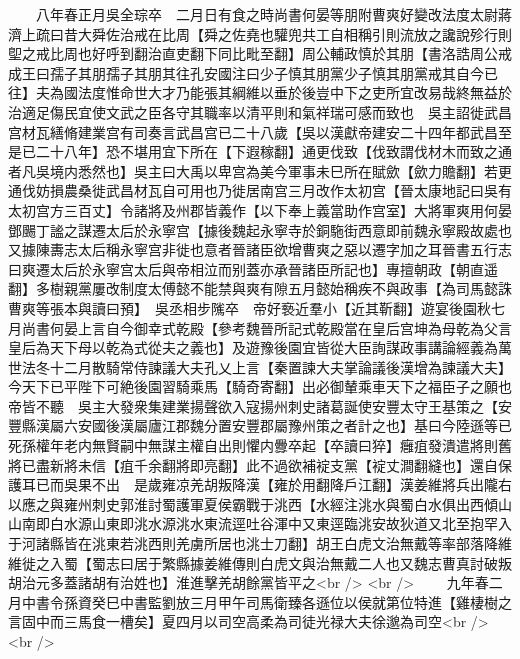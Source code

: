 　　八年春正月吳全琮卒　二月日有食之時尚書何晏等朋附曹爽好變改法度太尉蔣濟上疏曰昔大舜佐治戒在比周【舜之佐堯也驩兜共工自相稱引則流放之讒說殄行則堲之戒比周也好呼到翻治直吏翻下同比毗至翻】周公輔政慎於其朋【書洛誥周公戒成王曰孺子其朋孺子其朋其往孔安國注曰少子慎其朋黨少子慎其朋黨戒其自今已往】夫為國法度惟命世大才乃能張其綱維以垂於後豈中下之吏所宜改易哉終無益於治適足傷民宜使文武之臣各守其職率以清平則和氣祥瑞可感而致也　吳主詔徙武昌宫材瓦繕脩建業宫有司奏言武昌宫已二十八歲【吳以漢獻帝建安二十四年都武昌至是已二十八年】恐不堪用宜下所在【下遐稼翻】通更伐致【伐致謂伐材木而致之通者凡吳境内悉然也】吳主曰大禹以卑宫為美今軍事未巳所在賦歛【歛力贍翻】若更通伐妨損農桑徙武昌材瓦自可用也乃徙居南宫三月改作太初宫【晉太康地記曰吳有太初宫方三百丈】令諸將及州郡皆義作【以下奉上義當助作宫室】大將軍爽用何晏鄧颺丁謐之謀遷太后於永寧宫【據後魏起永寧寺於銅駞街西意即前魏永寧殿故處也又據陳夀志太后稱永寧宫非徙也意者晉諸臣欲增曹爽之惡以遷字加之耳晉書五行志曰爽遷太后於永寧宫太后與帝相泣而别蓋亦承晉諸臣所記也】專擅朝政【朝直遥翻】多樹親黨屢改制度太傅懿不能禁與爽有隙五月懿始稱疾不與政事【為司馬懿誅曹爽等張本與讀曰預】　吳丞相步隲卒　帝好䙝近羣小【近其靳翻】遊宴後園秋七月尚書何晏上言自今御幸式乾殿【參考魏晉所記式乾殿當在皇后宫坤為母乾為父言皇后為天下母以乾為式從夫之義也】及遊豫後園宜皆從大臣詢謀政事講論經義為萬世法冬十二月散騎常侍諫議大夫孔乂上言【秦置諫大夫掌論議後漢增為諫議大夫】今天下已平陛下可絶後園習騎乘馬【騎奇寄翻】出必御輦乘車天下之福臣子之願也帝皆不聽　吳主大發衆集建業揚聲欲入寇揚州刺史諸葛誕使安豐太守王基策之【安豐縣漢屬六安國後漢屬廬江郡魏分置安豐郡屬豫州策之者計之也】基曰今陸遜等已死孫權年老内無賢嗣中無謀主權自出則懼内釁卒起【卒讀曰猝】癰疽發潰遣將則舊將已盡新將未信【疽千余翻將即亮翻】此不過欲補䘺支黨【䘺丈澗翻縫也】還自保護耳已而吳果不出　是歲雍凉羌胡叛降漢【雍於用翻降戶江翻】漢姜維將兵出隴右以應之與雍州刺史郭淮討蜀護軍夏侯霸戰于洮西【水經注洮水與蜀白水俱出西傾山山南即白水源山東即洮水源洮水東流逕吐谷渾中又東逕臨洮安故狄道又北至抱罕入于河諸縣皆在洮東若洮西則羌虜所居也洮士刀翻】胡王白虎文治無戴等率部落降維維徙之入蜀【蜀志曰居于繁縣據姜維傳則白虎文與治無戴二人也又魏志曹真討破叛胡治元多蓋諸胡有治姓也】淮進擊羌胡餘黨皆平之<br />
<br />
　　九年春二月中書令孫資癸巳中書監劉放三月甲午司馬衛臻各遜位以侯就第位特進【雞棲樹之言固中而三馬食一槽矣】夏四月以司空高柔為司徒光禄大夫徐邈為司空<br />
<br />

